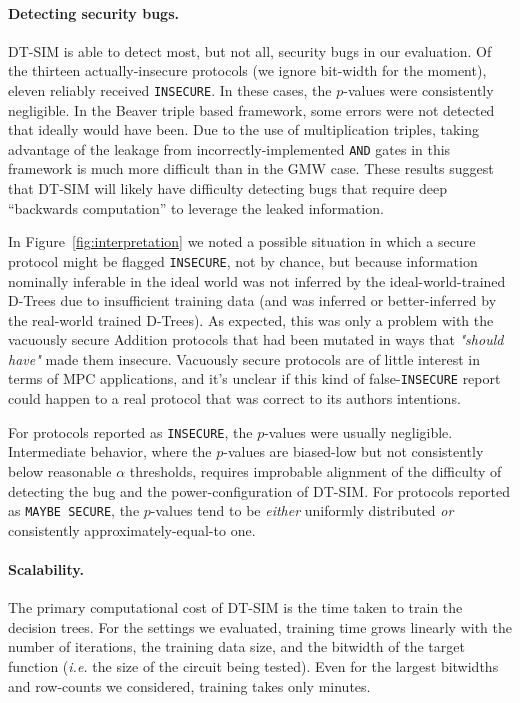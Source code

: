 \documentclass[acmlarge, manuscript, screen, review, anonymous, table]{acmart}
\newcommand{\ie}{\textit{i.e.}\xspace}
\newcommand{\toolname}{\textsc{DT-SIM}\xspace}
\begin{document}
\paragraph{Detecting security bugs.}
\toolname is able to detect most, but not all, security bugs in our evaluation.
Of the thirteen actually-insecure protocols (we ignore bit-width for the moment), eleven reliably received \texttt{INSECURE}.
In these cases, the $p$-values were consistently negligible.
In the Beaver triple based framework, some errors were not detected that ideally would have been.
Due to the use of multiplication triples, taking advantage of the leakage from incorrectly-implemented \texttt{AND} gates
in this framework is much more difficult than in the GMW case.
These results suggest that \toolname will likely have difficulty detecting bugs that require deep ``backwards computation''
to leverage the leaked information.

In Figure~\ref{fig:interpretation} we noted a possible situation in which a secure protocol might be flagged \texttt{INSECURE},
not by chance, but because information nominally inferable in the ideal world was not inferred by the ideal-world-trained D-Trees
due to insufficient training data
(and was inferred or better-inferred by the real-world trained D-Trees).
As expected, this was only a problem with the vacuously secure Addition protocols
that had been mutated in ways that \emph{"should have"} made them insecure.
Vacuously secure protocols are of little interest in terms of MPC applications,
and it's unclear if this kind of false-\texttt{INSECURE} report could happen
to a real protocol that was correct to its authors intentions.

For protocols reported as \texttt{INSECURE}, the $p$-values were usually negligible.
Intermediate behavior, where the $p$-values are biased-low but not consistently below reasonable $\alpha$ thresholds,
requires improbable alignment of the difficulty of detecting the bug and the power-configuration of \toolname.
For protocols reported as \texttt{MAYBE SECURE}, the $p$-values tend to be \emph{either} uniformly distributed
\emph{or} consistently approximately-equal-to one.


\paragraph{Scalability.}
The primary computational cost of \toolname is the time taken to train the decision trees.
For the settings we evaluated, training time grows linearly with the number of iterations,
the training data size, and the bitwidth of the target function (\ie the size of the circuit being tested).
Even for the largest bitwidths and row-counts we considered, training takes only minutes.
\end{document}
